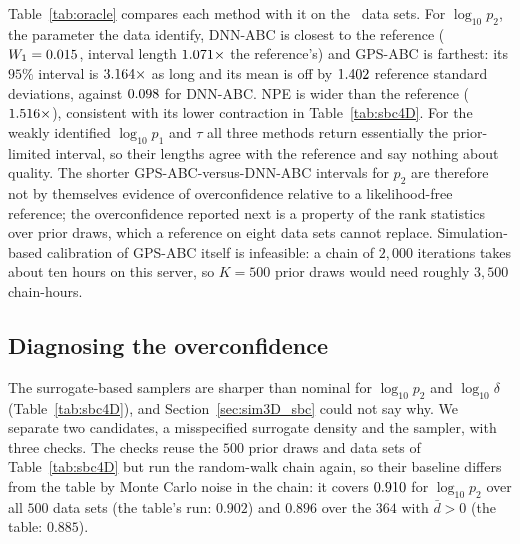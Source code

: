 \documentclass[sn-basic,iicol,pdflatex]{sn-jnl}
\begin{document}
Table~\ref{tab:oracle} compares each method with it on the \ptwoSummaryDnnAbcLogPTwoN\ data sets. For $\log_{10}p_2$, the parameter the data identify,
DNN-ABC is closest to the reference ($W_1=0.015$, interval length $1.071\times$ the reference's)
and GPS-ABC is farthest: its $95\%$ interval is $3.164\times$ as long and its mean is off by $1.402$ reference standard
deviations, against $0.098$ for DNN-ABC. NPE is wider than the reference
($1.516\times$), consistent with its lower contraction in Table~\ref{tab:sbc4D}. For the weakly identified $\log_{10}p_1$ and $\tau$ all three methods
return essentially the prior-limited interval, so their lengths agree with the reference and say nothing about quality. The shorter GPS-ABC-versus-DNN-ABC intervals
for $p_2$ are therefore not by themselves evidence of overconfidence relative to a likelihood-free reference; the overconfidence
reported next is a property of the rank statistics over prior draws, which a reference on eight data sets cannot replace.
Simulation-based calibration of GPS-ABC itself is infeasible: a chain of $2{,}000$ iterations takes about ten hours on this server, so $K=500$ prior draws would need roughly $3{,}500$ chain-hours.

\begin{table}[!t]
\centering
\caption{Study II: distance of each method's posterior from the synthetic-likelihood reference, $4$ data sets in each of the $2$ cases
(means over data sets). $W_1$ is in parameter units ($\log_{10}$ units for the rates); GPS-ABC is analyzed at $2{,}000$ iterations.}
\label{tab:oracle}
\small

\end{table}

\subsection{Diagnosing the overconfidence}
\label{sec:diagnose}

The surrogate-based samplers are sharper than nominal for $\log_{10}p_2$ and $\log_{10}\delta$ (Table~\ref{tab:sbc4D}), and Section~\ref{sec:sim3D_sbc} could not say why.
We separate two candidates, a misspecified surrogate density and the sampler, with three checks.
The checks reuse the $500$ prior draws and data sets of Table~\ref{tab:sbc4D} but run the random-walk chain again, so their baseline differs from the table by Monte Carlo noise in the chain: it covers $0.910$ for $\log_{10}p_2$ over all $500$ data sets (the table's run: $0.902$) and $0.896$ over the $364$ with $\bar d>0$ (the table: $0.885$).
\end{document}
